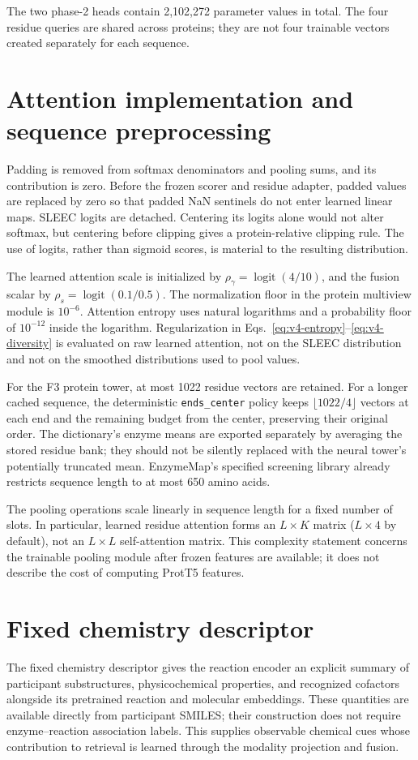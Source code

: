 The two phase-2 heads contain 2,102,272 parameter values in total.
The four residue queries are shared across proteins; they are not four
trainable vectors created separately for each sequence.

\section{Attention implementation and sequence preprocessing}
\label{app:v4-attention}
Padding is removed from softmax denominators and pooling sums, and its
contribution is zero. Before the frozen scorer and residue adapter, padded
values are replaced by zero so that padded NaN sentinels do not enter learned
linear maps. SLEEC logits are detached. Centering its logits alone would not
alter softmax, but centering before clipping gives a protein-relative clipping
rule. The use of logits, rather than sigmoid scores, is material to the
resulting distribution.

The learned attention scale is initialized by
$\rho_\gamma=\operatorname{logit}(4/10)$, and the fusion scalar by
$\rho_s=\operatorname{logit}(0.1/0.5)$. The normalization floor in the
protein multiview module is $10^{-6}$. Attention entropy uses natural
logarithms and a probability floor of $10^{-12}$ inside the logarithm.
Regularization in Eqs.~\eqref{eq:v4-entropy}--\eqref{eq:v4-diversity} is
evaluated on raw learned attention, not on the SLEEC distribution and not
on the smoothed distributions used to pool values.

For the F3 protein tower, at most 1022 residue vectors are retained. For a
longer cached sequence, the deterministic \texttt{ends\_center} policy keeps
$\lfloor1022/4\rfloor$ vectors at each end and the remaining budget from
the center, preserving their original order. The dictionary's enzyme means
are exported separately by averaging the stored residue bank; they should
not be silently replaced with the neural tower's potentially truncated mean.
EnzymeMap's specified screening library already restricts sequence length
to at most 650 amino acids.

The pooling operations scale linearly in sequence length for a fixed number
of slots. In particular, learned residue attention forms an $L\times K$
matrix ($L\times4$ by default), not an $L\times L$ self-attention matrix. This complexity statement
concerns the trainable pooling module after frozen features are available;
it does not describe the cost of computing ProtT5 features.

\section{Fixed chemistry descriptor}
\label{app:v4-chemistry}
The fixed chemistry descriptor gives the reaction encoder an explicit summary
of participant substructures, physicochemical properties, and recognized
cofactors alongside its pretrained reaction and molecular embeddings. These
quantities are available directly from participant SMILES; their construction
does not require enzyme--reaction association labels. This supplies observable
chemical cues whose contribution to retrieval is learned through the modality
projection and fusion.

